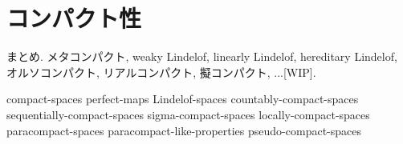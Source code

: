 \documentclass[uplatex, dvipdfmx, a4paper, 12pt, class=jsbook, crop=false]{standalone}
\begin{document}
\chapter{コンパクト性}
\label{chap:compactness}

まとめ.
メタコンパクト, weaky Lindelof, linearly Lindelof, hereditary Lindelof, オルソコンパクト, リアルコンパクト, 擬コンパクト, ...[WIP].

{compact-spaces}
{perfect-maps}
{Lindelof-spaces}
{countably-compact-spaces}
{sequentially-compact-spaces}
{sigma-compact-spaces}
{locally-compact-spaces}
{paracompact-spaces}
{paracompact-like-properties}
{pseudo-compact-spaces}
\end{document}
